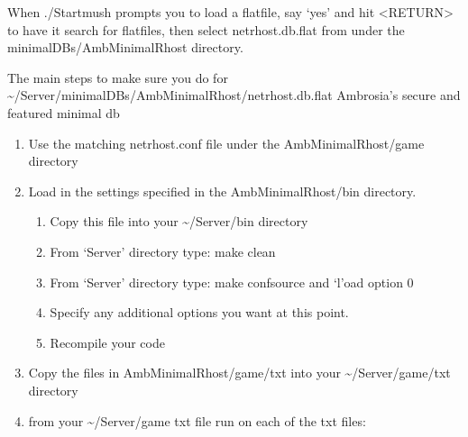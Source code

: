 \documentclass[letterpaper,10pt,english]{sphinxmanual}
\begin{document}
\sphinxAtStartPar
When ./Startmush prompts you to load a flatfile, say ‘yes’ and hit \textless{}RETURN\textgreater{} to have it search for flatfiles, then select netrhost.db.flat from under the minimal\sphinxhyphen{}DBs/Amb\sphinxhyphen{}MinimalRhost directory.

\sphinxAtStartPar
The main steps to make sure you do for \textasciitilde{}/Server/minimal\sphinxhyphen{}DBs/Amb\sphinxhyphen{}MinimalRhost/netrhost.db.flat \textendash{} Ambrosia’s secure and featured minimal db
\begin{enumerate}
%
\item {} 
\sphinxAtStartPar
Use the matching netrhost.conf file under the Amb\sphinxhyphen{}MinimalRhost/game directory

\item {} 
\sphinxAtStartPar
Load in the settings specified in the Amb\sphinxhyphen{}MinimalRhost/bin directory.
\begin{enumerate}
%
\item {} 
\sphinxAtStartPar
Copy this file into your \textasciitilde{}/Server/bin directory

\item {} 
\sphinxAtStartPar
From ‘Server’ directory type: make clean

\item {} 
\sphinxAtStartPar
From ‘Server’ directory type: make confsource and ‘l’oad option 0

\item {} 
\sphinxAtStartPar
Specify any \sphinxhyphen{}additional\sphinxhyphen{} options you want at this point.

\item {} 
\sphinxAtStartPar
Recompile your code

\end{enumerate}

\item {} 
\sphinxAtStartPar
Copy the files in Amb\sphinxhyphen{}MinimalRhost/game/txt into your \textasciitilde{}/Server/game/txt directory

\item {} 
\sphinxAtStartPar
from your \textasciitilde{}/Server/game txt file run on each of the txt files:

\begin{sphinxVerbatim}[commandchars=\\\{\}]
  
\end{sphinxVerbatim}

\end{enumerate}
\end{document}
